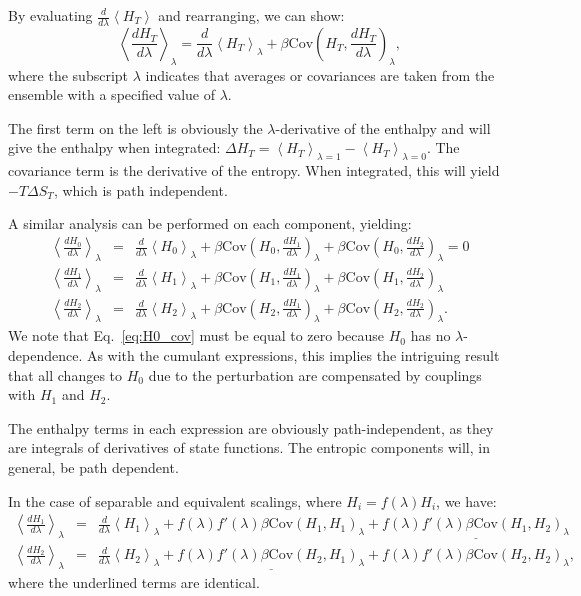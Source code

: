 \documentclass[%
 preprint,
 amsmath,amssymb,
 aps,
]{revtex4-1}
\begin{document}
By evaluating $\frac{d}{d\lambda}\left<H_T\right>$ and rearranging, we can show:
\begin{equation}
\left<\frac{dH_T}{d\lambda}\right>_\lambda = 
\frac{d}{d\lambda}\left<H_T\right>_\lambda +
\beta \mathrm{Cov}\left(H_T, \frac{dH_T}{d\lambda} \right)_\lambda,
\end{equation}
where the subscript $\lambda$ indicates that averages or covariances are taken from the ensemble with a specified value of $\lambda$.

The first term on the left is obviously the $\lambda$-derivative of the enthalpy and will give the enthalpy when integrated: $\Delta H_T = \left<H_T\right>_{\lambda=1} - \left<H_T\right>_{\lambda=0}$. The covariance term is the derivative of the entropy. When integrated, this will yield $-T\Delta S_T$, which is path independent.

A similar analysis can be performed on each component, yielding:
\begin{eqnarray}
\left<\frac{dH_0}{d\lambda}\right>_\lambda &=& 
\frac{d}{d\lambda}\left<H_0\right>_\lambda +
\beta\mathrm{Cov}\left(H_0, \frac{dH_1}{d\lambda} \right)_\lambda+
\beta\mathrm{Cov}\left(H_0, \frac{dH_2}{d\lambda} \right)_\lambda \label{eq:H0_cov}=0\\
\left<\frac{dH_1}{d\lambda}\right>_\lambda &=& 
\frac{d}{d\lambda}\left<H_1\right>_\lambda +
\beta\mathrm{Cov}\left(H_1, \frac{dH_1}{d\lambda} \right)_\lambda+
\beta\mathrm{Cov}\left(H_1, \frac{dH_2}{d\lambda} \right)_\lambda\\
\left<\frac{dH_2}{d\lambda}\right>_\lambda &=& 
\frac{d}{d\lambda}\left<H_2\right>_\lambda +
\beta\mathrm{Cov}\left(H_2, \frac{dH_1}{d\lambda} \right)_\lambda+
\beta\mathrm{Cov}\left(H_2, \frac{dH_2}{d\lambda} \right)_\lambda.
\end{eqnarray}
We note that Eq.~\ref{eq:H0_cov} must be equal to zero because $H_0$ has no $\lambda$-dependence. As with the cumulant expressions, this implies the intriguing result that all changes to $H_0$ due to the perturbation are compensated by couplings with $H_1$ and $H_2$.

The enthalpy terms in each expression are obviously path-independent, as they are integrals of derivatives of state functions. The entropic components will, in general, be path dependent.

In the case of separable and equivalent scalings, where $H_i = f(\lambda)H_i$, we have:
\begin{eqnarray}
\left<\frac{dH_1}{d\lambda}\right>_\lambda &=& 
\frac{d}{d\lambda}\left<H_1\right>_\lambda +
f(\lambda)f'(\lambda)\beta\mathrm{Cov}\left(H_1,H_1\right)_\lambda+
\underline{f(\lambda)f'(\lambda)\beta\mathrm{Cov}\left(H_1,H_2\right)_\lambda}\\
\left<\frac{dH_2}{d\lambda}\right>_\lambda &=& 
\frac{d}{d\lambda}\left<H_2\right>_\lambda +
\underline{f(\lambda)f'(\lambda)\beta\mathrm{Cov}\left(H_2,H_1 \right)_\lambda}+
f(\lambda)f'(\lambda)\beta\mathrm{Cov}\left(H_2,H_2 \right)_\lambda,
\end{eqnarray}
where the underlined terms are identical.
\end{document}
